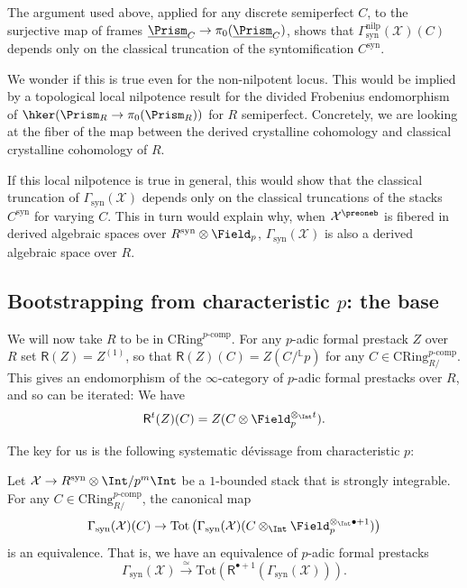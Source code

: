 \documentclass[10pt]{amsart}
\begin{document}
\begin{remark}
\label{rem:classical_truncation_enough}
The argument used above, applied for any discrete semiperfect $C$, to the surjective map of frames $\underline{\Prism}_C\to \pi_0(\underline{\Prism}_C)$, shows that $\Gamma^{\mathrm{nilp}}_{\mathrm{syn}}(\mathcal{X})(C)$ depends only on the classical truncation of the syntomification $C^{\mathrm{syn}}$. 

We wonder if this is true even for the non-nilpotent locus. This would be implied by a topological local nilpotence result for the divided Frobenius endomorphism of $\hker(\Prism_R\to \pi_0(\Prism_R))$ for $R$ semiperfect. Concretely, we are looking at the fiber of the map between the derived crystalline cohomology and classical crystalline cohomology of $R$.

If this local nilpotence is true in general, this would show that the classical truncation of $\Gamma_{\mathrm{syn}}(\mathcal{X})$ depends only on the classical truncations of the stacks $C^{\mathrm{syn}}$ for varying $C$. This in turn would explain why, when $\mathcal{X}^\preoneb$ is fibered in derived algebraic spaces over $R^{\mathrm{syn}}\otimes\Field_p$, $\Gamma_{\mathrm{syn}}(\mathcal{X})$ is also a derived algebraic space over $R$.
\end{remark}

 


\subsection{Bootstrapping from characteristic $p$: the base}
\label{subsec:1-bounded_stacks_bootstrapping_base}
We will now take $R$ to be in $\mathrm{CRing}^{p\text{-comp}}$. For any $p$-adic formal prestack $Z$ over $R$ set $\mathsf{R}(Z) = Z^{(1)}$, so that $\mathsf{R}(Z)(C) = Z(C/{}^{\mathbb{L}}p)$ for any $C\in \mathrm{CRing}^{p\text{-comp}}_{R/}$. This gives an endomorphism of the $\infty$-category of $p$-adic formal prestacks over $R$, and so can be iterated: We have
\[
\mathsf{R}^t(Z)(C) = Z(C\otimes \Field_p^{\otimes_{\Int}t}).
\]



The key for us is the following systematic d\'evissage from characteristic $p$:
\begin{proposition}
\label{prop:devissage}
Let $\mathcal{X}\to R^{\mathrm{syn}}\otimes\Int/p^m\Int$ be a $1$-bounded stack that is strongly integrable. For any $C\in \mathrm{CRing}^{p\text{-comp}}_{R/}$, the canonical map
\[
\Gamma_{\mathrm{syn}}(\mathcal{X})(C) \to \mathrm{Tot}\left(\Gamma_{\mathrm{syn}}(\mathcal{X})(C\otimes_{\Int} \Field_p^{\otimes_{\Int}\bullet +1})\right)
\]
is an equivalence. That is, we have an equivalence of $p$-adic formal prestacks
\[
\Gamma_{\mathrm{syn}}(\mathcal{X})\xrightarrow{\simeq}\mathrm{Tot}\left(\mathsf{R}^{\bullet +1}(\Gamma_{\mathrm{syn}}(\mathcal{X}))\right).
\]
\end{proposition}
\end{document}

